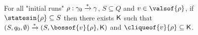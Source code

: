 
\begin{lemma}
	\label{lem:proof_completeness_covset_constant}
	For all "initial runs" $\rho: \gamma_0 \xrightarrow{*} \gamma$, $S \subseteq Q$ and $\aval \in \valsof{\run}$, if $\statesin{\run} \subseteq S$ then there exists $\mathsf{K}$ such that $(S, q_0, \emptyset) \step{*} (S,\bossof{\aval}{\run}, \clique)$ and $\cliqueof{\aval}{\run} \subseteq \clique$. 
\end{lemma}

